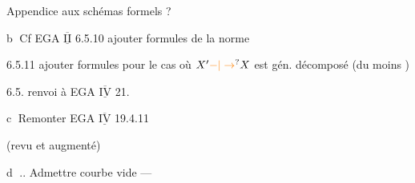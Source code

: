 {\reversemarginpar\margin{!}}Appendice   aux schémas formels ?

\textcircled{b} \quad Cf EGA $\underline{\overline{\mathrm{II}}}$ 6.5.10 ajouter formules de la norme

6.5.11 ajouter formules pour le cas où $X'\unsure{\mathbin{-}|\to}X$ est gén. décomposé (du moins )

6.5. renvoi à EGA $\underline{\overline{\mathrm{IV}}}$ 21.

\textcircled{c} \quad Remonter EGA $\underline{\overline{\mathrm{IV}}}$ 19.4.11

(revu et augmenté)

\textcircled{d} .. Admettre courbe vide ---

